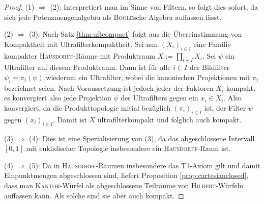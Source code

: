 \begin{proof}
  (1) $\Rightarrow$ (2): 
  Interpretiert man \PIT im Sinne von Filtern, so folgt dies sofort, da sich jede Potenzmengenalgebra als \textsc{Boole}sche Algebra auffassen lässt.

  (2) $\Rightarrow$ (3):
  Nach Satz \ref{thm:uftcompact} folgt aus \UFT die Übereinstimmung von Kompaktheit mit Ultrafilterkompaktheit.
  Sei nun $(X_i)_{i \in I}$ eine Familie kompakter \textsc{Hausdorff}\hyp{}Räume mit Produktraum $X := \prod_{i \in I} X_i$.
  Sei $\psi$ ein Ultrafilter auf diesem Produktraum.
  Dann ist für alle $i \in I$ der Bildfilter $\psi_i = \pi_i(\psi)$ wiederum ein Ultrafilter, wobei die kanonischen Projektionen mit $\pi_i$ bezeichnet seien.
  Nach Voraussetzung ist jedoch jeder der Faktoren $X_i$ kompakt, es konvergiert also jede Projektion $\psi$ des Ultrafilters gegen ein $x_i \in X_i$.
  Also konvergiert, da die Produkttopologie initial bezüglich $(\pi_i)_{i \in I}$ ist, der Filter $\psi$ gegen $(x_i)_{i \in I}$.
  Damit ist $X$ ultrafilterkompakt und folglich auch kompakt.

  (3) $\Rightarrow$ (4):
  Dies ist eine Spezialisierung von (3), da das abgeschlossene Intervall $[0,1]$ mit euklidischer Topologie insbesondere ein \textsc{Hausdorff}\hyp{}Raum ist.

  (4) $\Rightarrow$ (5):
  Da in \textsc{Hausdorff}\hyp{}Räumen insbesondere das T1\hyp{}Axiom gilt und damit Einpunktmengen abgeschlossen sind, liefert Proposition \ref{prop:cartesianclosed}, dass man \textsc{Kantor}\hyp{}Würfel als abgeschlossene Teilräume von \textsc{Hilbert}\hyp{}Würfeln auffassen kann. 
  Als solche sind sie aber auch kompakt.


\end{proof}
